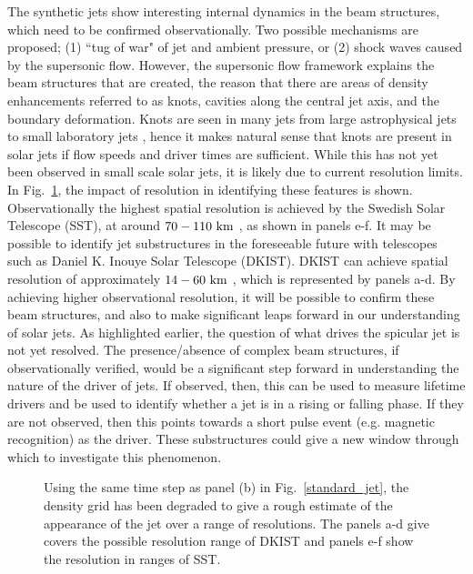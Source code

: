 %
The synthetic jets show interesting internal dynamics in the beam structures, which need to be confirmed observationally. Two possible mechanisms are proposed; (1) ``tug of war" of jet and ambient pressure, or (2) shock waves caused by the supersonic flow. However, the supersonic flow framework explains the beam structures that are created, the reason that there are areas of density enhancements referred to as knots, cavities along the central jet axis, and the boundary deformation. Knots are seen in many jets from large astrophysical jets \citep{van_Putten_1996ApJ467L57V, DeGouveiaDalPino2005, Hada2013ApJ77570H, Cohen2014ApJ787151C, Hervet2017AnA606A103H} to small laboratory jets \citep{Menon2010, Edgington-Mitchell2014, Ono2014}, hence it makes natural sense that knots are present in solar jets if flow speeds and driver times are sufficient. While this has not yet been observed in small scale solar jets, it is likely due to current resolution limits. In Fig.~\ref{degrid}, the impact of resolution in identifying these features is shown. Observationally the highest spatial resolution is achieved by the Swedish Solar Telescope (SST), at around $70-110~\rm{km}$ \citep{Scharmer2003SPIE4853341S,Berger2003ApJ}, as shown in panels e-f. It may be possible to identify jet substructures in the foreseeable future with telescopes such as Daniel K. Inouye Solar Telescope (DKIST). DKIST can achieve spatial resolution of approximately $14-60~\rm{km}$ \citep{Rast2020arXiv,Rimmele2020SoPh}, which is represented by panels a-d. By achieving higher observational resolution, it will be possible to confirm these beam structures, and also to make significant leaps forward in our understanding of solar jets. \np
%
As highlighted earlier, the question of what drives the spicular jet is not yet resolved. The presence/absence of complex beam structures, if observationally verified, would be a significant step forward in understanding the nature of the driver of jets. If observed, then, this can be used to measure lifetime drivers and be used to identify whether a jet is in a rising or falling phase. If they are not observed, then this points towards a short pulse event (e.g. magnetic recognition) as the driver. These substructures could give a new window through which to investigate this phenomenon.
\begin{figure}
\captionsetup[subfigure]{labelformat=empty}
\centering
{}
\caption{Using the same time step as panel (b) in Fig.~\ref{standard_jet}, the density grid has been degraded to give a rough estimate of the appearance of the jet over a range of resolutions. The panels a-d give covers the possible resolution range of DKIST and panels e-f show the resolution in ranges of SST.}
\label{degrid}
\end{figure}